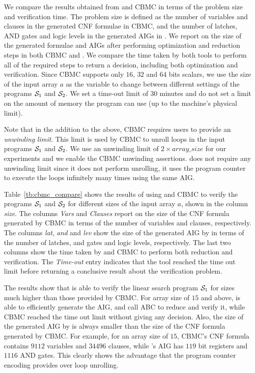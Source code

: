We compare the results obtained from \mytool{} and CBMC in terms of the problem size and
verification time. The problem size is defined as the number of variables and clauses 
in the generated CNF formulae in CBMC, and the number of latches, AND gates and logic levels
in the generated AIGs in \mytool{}. We report on the size of the generated formulae and AIGs
after performing optimization and reduction steps in both CBMC and \mytool{}. We compare 
the time taken by both tools to perform all of the required steps to return a decision, 
including both optimization and verification.
Since CBMC supports only $16$, $32$ and $64$ bits scalars, we use the size of the input
array $a$ as the variable to change between different settings of the programs $\mathcal{S}_1$
and $\mathcal{S}_2$. We set a time-out limit of $30$ minutes and do not set a limit on the 
amount of memory the program can use (up to the machine's physical limit).

Note that in the addition to the above, CBMC requires users to provide an {\em unwinding
limit}. This limit is used by CBMC to unroll loops in the input programs $\mathcal{S}_1$ and $\mathcal{S}_2$.
We use an unwinding limit of $2\times array\_size$ for our experiments and we enable 
the CBMC unwinding assertions. \mytool{} does not require any unwinding limit since
it does not perform unrolling, it uses the program counter to execute the loops infinitely 
many times using the same AIG. 

Table~\ref{tb:cbmc_compare} shows the results of using \mytool{} and CBMC to verify the 
programs $\mathcal{S}_1$ and $\mathcal{S}_2$ for different sizes of the input array $a$, shown in the 
column {\em size}. The columns {\em Vars} and {\em Clauses} report on the size of the
CNF formula generated by CBMC in terms of the number of variables and clauses, respectively. 
The columns {\em lat}, {\em and} and {\em lev} show the size of the generated AIG by \mytool{}
in terms of the number of latches, and gates and logic levels, respectively. The last two columns
show the time taken by \mytool{} and CBMC to perform both reduction and verification. 
The {\em Time-out} entry indicates that the tool reached the time out limit before 
returning a conclusive result about the verification problem.



The results show that \mytool{} is able to verify the linear search program $\mathcal{S}_1$ 
for sizes much higher than those provided by CBMC. For array size of $15$ and above, \mytool{}
is able to efficiently generate the AIG, and call ABC to reduce and verify it, while CBMC
reached the time out limit without giving any decision. Also, the size of the generated AIG 
by \mytool{} is always smaller than the size of the CNF formula generated by CBMC.
For example, for an array size of $15$, CBMC's CNF formula contains $9112$ variables
and $34496$ clauses, while \mytool{}'s AIG has $119$ bit registers and $1116$ AND gates.
This clearly shows the advantage that the program counter encoding provides over 
loop unrolling. 

